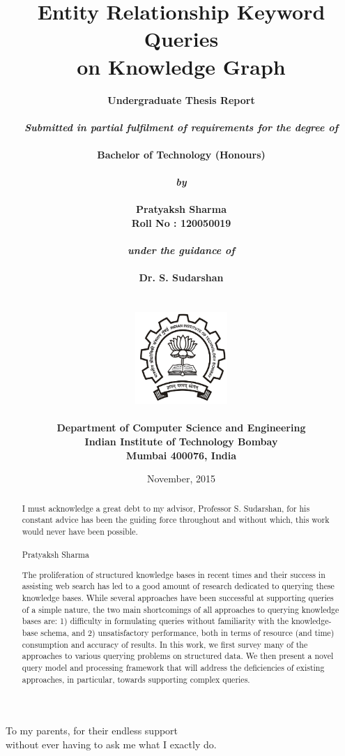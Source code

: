 \documentclass[a4paper, twoside, 12pt]{report}
\title{\textbf{Entity Relationship Keyword Queries \\ on Knowledge Graph}}
\author{
		\bf{Undergraduate Thesis Report}\\
        \\
        \emph{Submitted in partial fulfilment of requirements for the degree of}\\
        \\
        \bf{Bachelor of Technology (Honours)}\\
        \\
        \emph{by}\\
        \\
		\bf{Pratyaksh Sharma}\\
        \bf{Roll No : 120050019}\\
        \\
        \emph{under the guidance of}\\
        \\
		\bf{Dr. S. Sudarshan}\\
        \\\\
        \includegraphics[height=3.5cm]{iitb_logo.jpg}\\
        \\
		\bf{Department of Computer Science and Engineering}\\
        \bf{Indian Institute of Technology Bombay}\\
        \bf{Mumbai 400076, India}\\
}
\date{November, 2015}
\makeatletter
\newenvironment{dedication}
  {\clearpage           %
   \thispagestyle{empty}%
   \vspace*{\stretch{1}}%
   \itshape             %
   \center          %
  }
  {\par %
   \vspace{\stretch{3}} %
   \clearpage           %
}
\newcommand\frontmatter{%
    \cleardoublepage
  \pagenumbering{roman}}
\newcommand\mainmatter{%
    \cleardoublepage
  \pagenumbering{arabic}}
\makeatother
\begin{document}
\frontmatter

\maketitle


\begin{dedication}
To my parents, for their endless support \\
 without ever having to ask me what I exactly do.
\end{dedication}


\renewcommand{\abstractname}{Acknowledgements}

\begin{abstract}
  I must acknowledge a great debt to my advisor, Professor S. Sudarshan, for his constant advice has been the guiding force throughout and without which, this work would never have been possible. 
  \\ \\
Pratyaksh Sharma
\end{abstract}


\renewcommand{\abstractname}{Abstract}
\begin{abstract}
  The proliferation of structured knowledge bases in recent times and their success in assisting web search has led to a good amount of research dedicated to querying these knowledge bases. While several approaches have been successful at supporting queries of a simple nature, the two main shortcomings of all approaches to querying knowledge bases are: 1) difficulty in formulating queries without familiarity with the knowledge-base schema, and 2) unsatisfactory performance, both in terms of resource (and time) consumption and accuracy of results. In this work, we first survey many of the approaches to various querying problems on structured data. We then present a novel query model and processing framework that will address the deficiencies of existing approaches, in particular, towards supporting complex queries.

\end{abstract}


\tableofcontents

\mainmatter


\pagebreak














\begin{thebibliography}{9}

\end{thebibliography}
\end{document}
